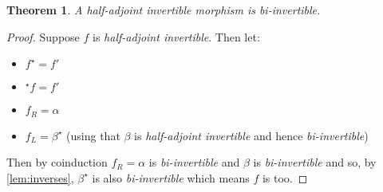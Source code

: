 \documentclass{article}
\newtheorem{theorem}{Theorem}
\theoremstyle{definition}
\theoremstyle{examplestyle}
\newcommand{\linv}[1]{{}^\star\!#1}
\newcommand{\rinv}[1]{#1^\star}
\begin{document}
\begin{theorem}
  A \emph{half-adjoint invertible} morphism is \emph{bi-invertible}.
\end{theorem}
\begin{proof}
  Suppose \(f\) is \emph{half-adjoint invertible}. Then let:
  \begin{itemize}
  \item \(\rinv f = {f'}\)
  \item \(\linv f = {f'}\)
  \item \(f_R = \alpha\)
  \item \(f_L = \rinv \beta\) (using that \(\beta\) is \emph{half-adjoint invertible} and hence \emph{bi-invertible})
  \end{itemize}
  Then by coinduction \(f_R = \alpha\) is \emph{bi-invertible} and \(\beta\) is \emph{bi-invertible} and so, by \cref{lem:inverses}, \(\rinv \beta\) is also \emph{bi-invertible} which means \(f\) is too.
\end{proof}
\end{document}
